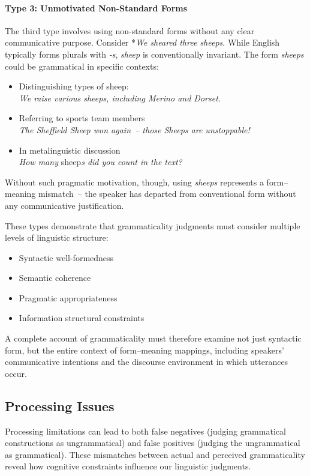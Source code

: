 \paragraph*{Type 3: Unmotivated Non-Standard Forms} The third type involves using non-standard forms without any clear communicative purpose. Consider *\textit{We sheared three sheeps}. While English typically forms plurals with \textit{-s}, \textit{sheep} is conventionally invariant. The form \textit{sheeps} could be grammatical in specific contexts:
\begin{itemize}[noitemsep]
    \item Distinguishing types of sheep: \\\textit{We raise various sheeps, including Merino and Dorset.}
    \item Referring to sports team members \\\textit{The Sheffield Sheep won again~-- those Sheeps are unstoppable!}
    \item In metalinguistic discussion \\\textit{How many }sheep\textit{s did you count in the text?}
\end{itemize}

Without such pragmatic motivation, though, using \textit{sheeps} represents a form--meaning mismatch~-- the speaker has departed from conventional form without any communicative justification.

These types demonstrate that grammaticality judgments must consider multiple levels of linguistic structure:
\begin{itemize}[noitemsep]
    \item Syntactic well-formedness
    \item Semantic coherence
    \item Pragmatic appropriateness
    \item Information structural constraints
\end{itemize}

A complete account of grammaticality must therefore examine not just syntactic form, but the entire context of form--meaning mappings, including speakers' communicative intentions and the discourse environment in which utterances occur.

\subsection{Processing Issues}

Processing limitations can lead to both false negatives (judging grammatical constructions as ungrammatical) and false positives (judging the ungrammatical as grammatical). These mismatches between actual and perceived grammaticality reveal how cognitive constraints influence our linguistic judgments.

